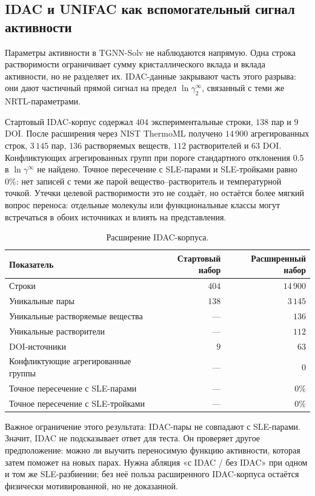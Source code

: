 \documentclass[11pt]{article}
\theoremstyle{definition}
\begin{document}
\subsection{IDAC и UNIFAC как вспомогательный сигнал активности}

Параметры активности в TGNN-Solv не наблюдаются напрямую. Одна строка растворимости ограничивает сумму кристаллического вклада и вклада активности, но не разделяет их. IDAC-данные закрывают часть этого разрыва: они дают частичный прямой сигнал на предел $\ln\gamma_2^{\infty}$, связанный с теми же NRTL-параметрами.

Стартовый IDAC-корпус содержал $404$ экспериментальные строки, $138$ пар и $9$ DOI. После расширения через NIST ThermoML получено $14\,900$ агрегированных строк, $3\,145$ пар, $136$ растворяемых веществ, $112$ растворителей и $63$ DOI. Конфликтующих агрегированных групп при пороге стандартного отклонения $0.5$ в $\ln\gamma^\infty$ не найдено. Точное пересечение с SLE-парами и SLE-тройками равно $0\%$: нет записей с теми же парой вещество--растворитель и температурной точкой. Утечки целевой растворимости это не создаёт, но остаётся более мягкий вопрос переноса: отдельные молекулы или функциональные классы могут встречаться в обоих источниках и влиять на представления.

\begin{table}[!htbp]
\centering
\caption{Расширение IDAC-корпуса.}
\label{tab:app-idac-expansion}
\small
\begin{tabular}{lrr}
\toprule
Показатель & Стартовый набор & Расширенный набор \\
\midrule
Строки & $404$ & $14\,900$ \\
Уникальные пары & $138$ & $3\,145$ \\
Уникальные растворяемые вещества & --- & $136$ \\
Уникальные растворители & --- & $112$ \\
DOI-источники & $9$ & $63$ \\
Конфликтующие агрегированные группы & --- & $0$ \\
Точное пересечение с SLE-парами & --- & $0\%$ \\
Точное пересечение с SLE-тройками & --- & $0\%$ \\
\bottomrule
\end{tabular}
\end{table}

Важное ограничение этого результата: IDAC-пары не совпадают с SLE-парами. Значит, IDAC не подсказывает ответ для теста. Он проверяет другое предположение: можно ли выучить переносимую функцию активности, которая затем поможет на новых парах. Нужна абляция «с IDAC / без IDAC» при одном и том же SLE-разбиении; без неё польза расширенного IDAC-корпуса остаётся физически мотивированной, но не доказанной.
\end{document}
